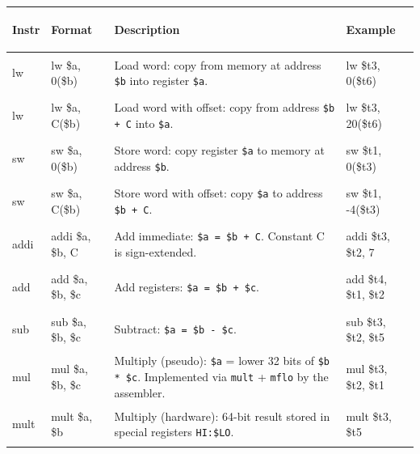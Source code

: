\documentclass[11pt, letterpaper]{article}
\begin{document}
\noindent
{\small\renewcommand{\arraystretch}{1.6}
\begin{tabularx}{\textwidth}{>{\ttfamily\bfseries\raggedright\arraybackslash}p{1.4cm}
                              >{\ttfamily\raggedright\arraybackslash}p{3.6cm}
                              >{\raggedright\arraybackslash}X
                              >{\ttfamily\raggedright\arraybackslash}p{3.2cm}}
\toprule
\rowcolor{tableheader}
\textbf{Instr} & \textbf{Format} & \textbf{Description} & \textbf{Example} \\
\midrule
\rowcolor{rowA}  lw   & lw \$a, 0(\$b)      & Load word: copy from memory at address \texttt{\$b} into register \texttt{\$a}.                                                               & lw \$t3, 0(\$t6)         \\
\rowcolor{rowB}  lw   & lw \$a, C(\$b)      & Load word with offset: copy from address \texttt{\$b + C} into \texttt{\$a}.                                                              & lw \$t3, 20(\$t6)        \\
\rowcolor{rowA}  sw   & sw \$a, 0(\$b)      & Store word: copy register \texttt{\$a} to memory at address \texttt{\$b}.                                                                  & sw \$t1, 0(\$t3)         \\
\rowcolor{rowB}  sw   & sw \$a, C(\$b)      & Store word with offset: copy \texttt{\$a} to address \texttt{\$b + C}.                                                                    & sw \$t1, -4(\$t3)        \\
\rowcolor{rowA}  addi & addi \$a, \$b, C    & Add immediate: \texttt{\$a = \$b + C}. Constant C is sign-extended.                                                                        & addi \$t3, \$t2, 7       \\
\rowcolor{rowB}  add  & add \$a, \$b, \$c  & Add registers: \texttt{\$a = \$b + \$c}.                                                                                                  & add \$t4, \$t1, \$t2     \\
\rowcolor{rowA}  sub  & sub \$a, \$b, \$c  & Subtract: \texttt{\$a = \$b - \$c}.                                                                                                       & sub \$t3, \$t2, \$t5     \\
\rowcolor{rowB}  mul  & mul \$a, \$b, \$c  & Multiply (pseudo): \texttt{\$a} = lower 32 bits of \texttt{\$b * \$c}. Implemented via \texttt{mult} + \texttt{mflo} by the assembler.      & mul \$t3, \$t2, \$t1     \\
\rowcolor{rowA}  mult & mult \$a, \$b      & Multiply (hardware): 64-bit result stored in special registers \texttt{HI:\$LO}.                                                           & mult \$t3, \$t5          \\

\end{tabularx}}
\end{document}
